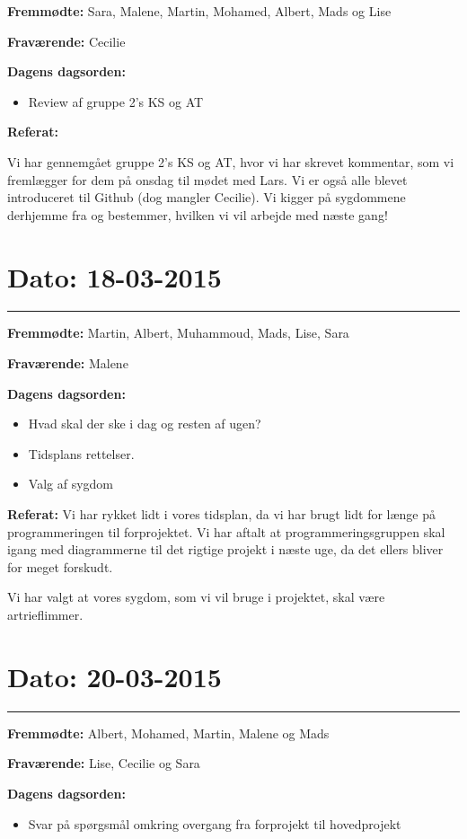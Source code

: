 \textbf{Fremmødte:} Sara, Malene, Martin, Mohamed, Albert, Mads og Lise 

\textbf{Fraværende:} Cecilie

\textbf{Dagens dagsorden:}
\begin{itemize}
	\item Review af gruppe 2's KS og AT
\end{itemize}

\textbf{Referat:}

Vi har gennemgået gruppe 2's KS og AT, hvor vi har skrevet kommentar, som vi fremlægger for dem på onsdag til mødet med Lars. 
Vi er også alle blevet introduceret til Github (dog mangler Cecilie). 
Vi kigger på sygdommene derhjemme fra og bestemmer, hvilken vi vil arbejde med næste gang! 

\section{Dato: 18-03-2015}
\hrule

\textbf{Fremmødte:} Martin, Albert, Muhammoud, Mads, Lise, Sara

\textbf{Fraværende:} Malene

\textbf{Dagens dagsorden:}

\begin{itemize}
	\item Hvad skal der ske i dag og resten af ugen? 
	\item Tidsplans rettelser. 
	\item Valg af sygdom
\end{itemize}

\textbf{Referat:}
Vi har rykket lidt i vores tidsplan, da vi har brugt lidt for længe på programmeringen til forprojektet. Vi har aftalt at programmeringsgruppen skal igang med diagrammerne til det rigtige projekt i næste uge, da det ellers bliver for meget forskudt. 

Vi har valgt at vores sygdom, som vi vil bruge i projektet, skal være artrieflimmer. 


\section{Dato: 20-03-2015}
\hrule

\textbf{Fremmødte:} Albert, Mohamed, Martin, Malene og Mads 

\textbf{Fraværende:} Lise, Cecilie og Sara

\textbf{Dagens dagsorden:}
\begin{itemize}
	\item Svar på spørgsmål omkring overgang fra forprojekt til hovedprojekt
\end{itemize}

